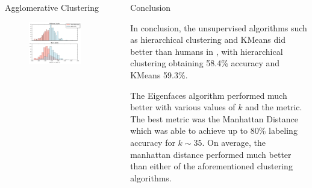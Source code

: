 \documentclass[final]{beamer}
\newlength{\sepwid}
\newlength{\onecolwid}
\begin{document}
\begin{frame}[t]
\begin{columns}[t]
\begin{column}{\onecolwid}
\begin{block}{Agglomerative Clustering}
\begin{figure}
\centering
  \includegraphics[width=.75\linewidth]{../data/eigennorm.pdf}
  \label{fig:eigennorm}
\end{figure}


\end{block}



\end{column} %


\begin{column}{\sepwid}\end{column} %

\begin{column}{\onecolwid} %


\begin{block}{Conclusion}

In conclusion, the unsupervised algorithms such as hierarchical clustering and KMeans did better than humans in \cite{MormonID}, with hierarchical clustering obtaining 58.4\% accuracy and KMeans 59.3\%. 

The Eigenfaces algorithm performed much better with various values of $k$ and the metric. The best metric was the Manhattan Distance which was able to achieve up to 80\% labeling accuracy for $k \sim 35$. On average, the manhattan distance performed much better than either of the aforementioned clustering algorithms.


\end{block}
\end{column}
\end{columns}
\end{frame}
\end{document}
